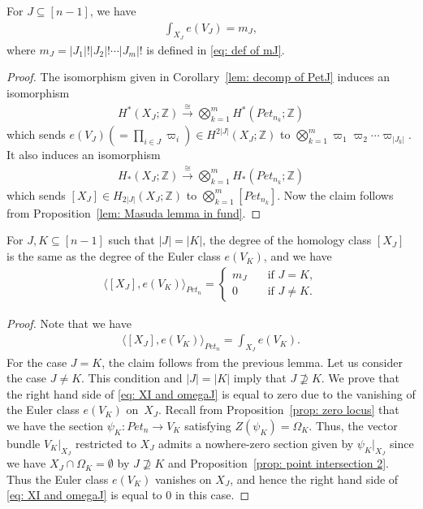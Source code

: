 \begin{lemma}\label{lem: geometry of mJ}
For $J\subseteq[n-1]$, we have
\begin{align*}
\int_{X_{J}} e(V_J) = m_J , 
\end{align*}
where $m_J=|J_1| ! |J_2| ! \cdots |J_m| !$ is defined in \eqref{eq: def of mJ}.
\end{lemma}

\begin{proof}
The isomorphism given in Corollary~\ref{lem: decomp of PetJ} induces an isomorphism
\begin{align*}
H^*(X_J;{\mathbb Z}) \stackrel{\cong}{\rightarrow} \bigotimes_{k=1}^{m} H^*(Pet_{n_k};{\mathbb Z})
\end{align*}
which sends
$e(V_J)(=\prod_{i\in J}\varpi_i) \in H^{2|J|}(X_{J};{\mathbb Z})$ to $\bigotimes_{k=1}^{m} \varpi_1\varpi_2\cdots \varpi_{|J_k|}$. It also induces an isomorphism
\begin{align*}
H_*(X_J;{\mathbb Z}) \stackrel{\cong}{\rightarrow} \bigotimes_{k=1}^{m} H_*(Pet_{n_k};{\mathbb Z})
\end{align*}
which sends $[X_{J}]\in H_{2|J|}(X_J;{\mathbb Z})$ to $\bigotimes_{k=1}^{m}[Pet_{n_k}]$. Now the claim follows from Proposition~\ref{lem: Masuda lemma in fund}.
\end{proof}

\begin{prop}\label{prop: duality}
For $J,K\subseteq [n-1]$ such that $|J|=|K|$, the degree of the homology class $[X_{J}]$ is the same as the degree of the Euler class $e(V_K)$, 
and we have
\begin{align*} 
\langle [X_{J}] , e(V_K) \rangle_{Pet_{n}} 
=
\begin{cases}
m_J \quad &\text{if $J=K$}, \\
0 &\text{if $J\ne K$}.
\end{cases}
\end{align*}
\end{prop}

\begin{proof}
Note that we have 
\begin{equation}
\begin{split}\label{eq: XI and omegaJ}
\langle [X_{J}] , e(V_K) \rangle_{Pet_{n}} 
= \int_{X_{J}}  e(V_K).
\end{split}
\end{equation}
For the case $J=K$, the claim follows from the previous lemma. Let us consider the case $J\ne K$. This condition and $|J|= |K|$ imply that $J\not\supseteq K$. 
We prove that the right hand side of \eqref{eq: XI and omegaJ} is equal to zero due to the vanishing of the Euler class $e(V_K)$ on~$X_{J}$.
Recall from Proposition~\ref{prop: zero locus} that we have the section $\psi_{K}\colon Pet_{n} \rightarrow V_{K}$ satisfying $Z(\psi_K)=\Omega_K$. Thus, the vector bundle $V_{K}|_{X_J}$ restricted to $X_J$ admits a nowhere-zero section given by $\psi_K|_{X_J}$ since we have $X_J\cap\Omega_K=\emptyset$ by $J\not\supseteq K$ and Proposition~\ref{prop: point intersection 2}. Thus the Euler class $e(V_K)$ vanishes on $X_J$, and hence the right hand side of \eqref{eq: XI and omegaJ} is equal to $0$ in this case.
\end{proof}

